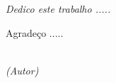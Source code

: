 \documentclass[
	12pt,			%
	openany,		%
	oneside,		%
	a4paper,		%
	english,		%
	brazil			%
	]{abntex2}
\begin{document}

\frenchspacing  %


\imprimircapa

\imprimirfolhaderosto*  %

%
 \begin{fichacatalografica}
 \end{fichacatalografica}


% 
\newpage
\begin{dedicatoria}
   \vspace*{\fill} \centering \noindent 
   \textit{Dedico este trabalho .....} 
   \vspace*{\fill}
\end{dedicatoria}

\begin{agradecimentos}
Agradeço .....
\end{agradecimentos}

\begin{epigrafe}
   \vspace*{\fill}
   \begin{flushright}
	\textit{ \\
	(Autor) }
   \end{flushright}
\end{epigrafe}
\end{document}
